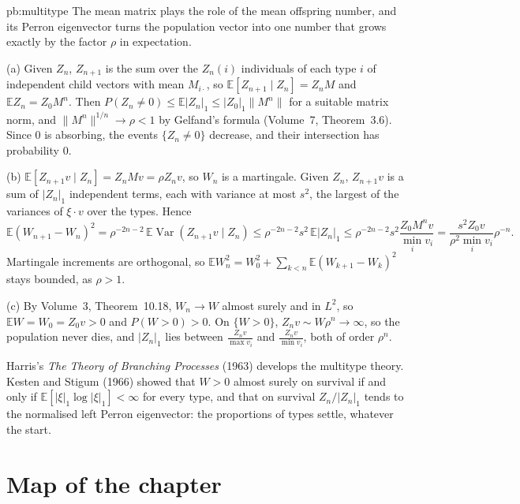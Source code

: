 \begin{solution}{pb:multitype}
\idea The mean matrix plays the role of the mean offspring number, and its Perron eigenvector turns the population vector into one number that grows exactly by the factor $\rho$ in expectation.

\writeup (a) Given $Z_n$, $Z_{n+1}$ is the sum over the $Z_n(i)$ individuals of each type $i$ of independent child vectors with mean $M_{i\cdot}$, so $\mathbb E[Z_{n+1}\mid Z_n]=Z_nM$ and
$\mathbb EZ_n=Z_0M^n$. Then $P(Z_n\ne0)\le\mathbb E|Z_n|_1\le|Z_0|_1\|M^n\|$ for a suitable matrix norm, and $\|M^n\|^{1/n}\to\rho<1$ by Gelfand's formula (Volume~7, Theorem~3.6). Since $0$ is absorbing, the
events $\{Z_n\ne0\}$ decrease, and their intersection has probability $0$.

(b) $\mathbb E[Z_{n+1}v\mid Z_n]=Z_nMv=\rho Z_nv$, so $W_n$ is a martingale. Given $Z_n$, $Z_{n+1}v$ is a sum of $|Z_n|_1$ independent terms, each with variance at most $s^2$, the largest of the
variances of $\xi\cdot v$ over the types. Hence
\[
\mathbb E(W_{n+1}-W_n)^2=\rho^{-2n-2}\,\mathbb E\operatorname{Var}(Z_{n+1}v\mid Z_n)\le\rho^{-2n-2}s^2\,\mathbb E|Z_n|_1\le\rho^{-2n-2}s^2\frac{Z_0M^nv}{\min_iv_i}=\frac{s^2Z_0v}{\rho^2\min_iv_i}\rho^{-n}.
\]
Martingale increments are orthogonal, so $\mathbb EW_n^2=W_0^2+\sum_{k<n}\mathbb E(W_{k+1}-W_k)^2$ stays bounded, as $\rho>1$.

(c) By Volume~3, Theorem~10.18, $W_n\to W$ almost surely and in $L^2$, so $\mathbb EW=W_0=Z_0v>0$ and $P(W>0)>0$. On $\{W>0\}$, $Z_nv\sim W\rho^n\to\infty$, so the population never dies, and
$|Z_n|_1$ lies between $\frac{Z_nv}{\max v_i}$ and $\frac{Z_nv}{\min v_i}$, both of order $\rho^n$.

\leads Harris's \emph{The Theory of Branching Processes} (1963) develops the multitype theory. Kesten and Stigum (1966) showed that $W>0$ almost surely on survival if and only if
$\mathbb E[|\xi|_1\log|\xi|_1]<\infty$ for every type, and that on survival $Z_n/|Z_n|_1$ tends to the normalised left Perron eigenvector: the proportions of types settle, whatever the start.
\end{solution}

\section*{Map of the chapter}

